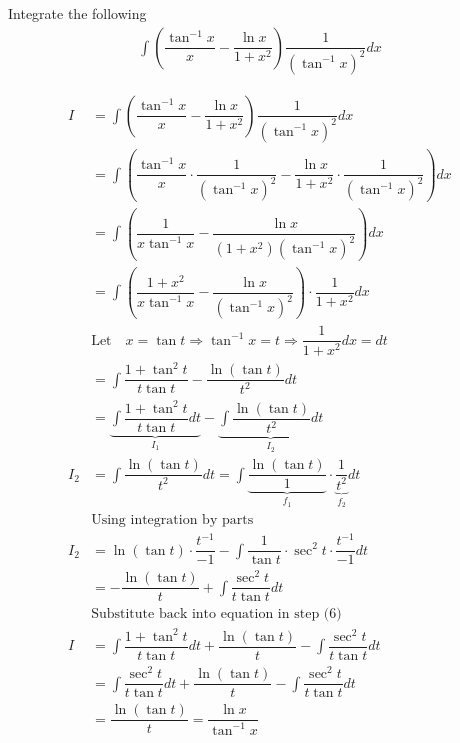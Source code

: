 



\question Integrate the following
\begin{align}
    \int \left(\dfrac{\tan^{-1}x}{x}-\dfrac{\ln x}{1+x^2}\right)\dfrac{1}{(\tan^{-1}x)^2}dx \nonumber
\end{align}


\begin{solution}
  \begin{align}
    I &= \int \left(\dfrac{\tan^{-1}x}{x}-\dfrac{\ln x}{1+x^2}\right)\dfrac{1}{(\tan^{-1}x)^2}dx \\
      &= \int \left(\dfrac{\tan^{-1}x}{x}\cdot\dfrac{1}{(\tan^{-1}x)^2}-
                    \dfrac{\ln x}{1+x^2}\cdot\dfrac{1}{(\tan^{-1}x)^2}\right)dx \\
      &= \int \left(\dfrac{1}{x\tan^{-1}x}-\dfrac{\ln x}{(1+x^2)(\tan^{-1}x)^2}\right)dx \\
      &= \int \left(\dfrac{1+x^2}{x\tan^{-1}x}-\dfrac{\ln x}{(\tan^{-1}x)^2}\right)
              \cdot\dfrac{1}{1+x^2}dx \\
      &\text{Let}\quad x=\tan t\Rightarrow\tan^{-1}x=t\Rightarrow \dfrac{1}{1+x^2}dx=dt \nonumber \\
      &= \int \dfrac{1+\tan^2 t}{t\tan t}-\dfrac{\ln (\tan t)}{t^2}dt \\
      &= \underbrace{\int\dfrac{1+\tan^2 t}{t\tan t}dt}_{I_1}-
         \underbrace{\int\dfrac{\ln (\tan t)}{t^2}dt}_{I_2} \\
    I_2 &= \int\dfrac{\ln (\tan t)}{t^2}dt 
         = \int\underbrace{\dfrac{\ln (\tan t)}{1}}_{f_1}\cdot\underbrace{\dfrac{1}{t^2}}_{f_2}dt \\
        &\text{Using integration by parts} \nonumber \\
    I_2 &= \ln(\tan t)\cdot\dfrac{t^{-1}}{-1} - 
           \int \dfrac{1}{\tan t}\cdot\sec^{2}t\cdot\dfrac{t^{-1}}{-1}dt \\
        &= -\dfrac{\ln(\tan t)}{t} + \int \dfrac{\sec^{2}t}{t\tan t}dt \\
        &\text{Substitute back into equation in step (6)} \nonumber \\
    I &= \int\dfrac{1+\tan^2 t}{t\tan t}dt + \dfrac{\ln(\tan t)}{t} - \int \dfrac{\sec^{2}t}{t\tan t}dt \\
      &= \int\dfrac{\sec^2 t}{t\tan t}dt + \dfrac{\ln(\tan t)}{t} - \int \dfrac{\sec^{2}t}{t\tan t}dt \\
      &= \dfrac{\ln(\tan t)}{t} = \dfrac{\ln x}{\tan^{-1}x}
  \end{align}
\end{solution}
